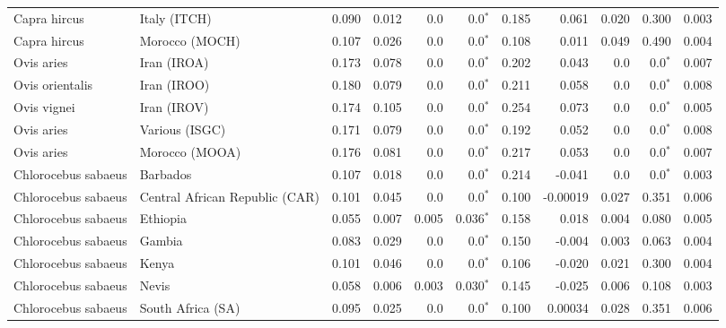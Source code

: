 \documentclass{article}
\begin{document}
\begin{table*}[h!]
\begin{adjustbox}{width = 1\textwidth}
\begin{tabular}{|l|l|r|r|r|r|r|r|r|r|r|}
\rowcolor{LIGHTGREY} Capra hircus & Italy (ITCH) & 0.090 & 0.012 & 0.0 & 0.0$\bm{^*}$ & 0.185 & 0.061 & 0.020 & 0.300\hspace{5pt} & 0.003 \\
\rowcolor{LIGHTGREY} Capra hircus & Morocco (MOCH) & 0.107 & 0.026 & 0.0 & 0.0$\bm{^*}$ & 0.108 & 0.011 & 0.049 & 0.490\hspace{5pt} & 0.004 \\ \hline
					 Ovis aries & Iran (IROA) & 0.173 & 0.078 & 0.0 & 0.0$\bm{^*}$ & 0.202 & 0.043 & 0.0 & 0.0$\bm{^*}$ & 0.007 \\
					 Ovis orientalis & Iran (IROO) & 0.180 & 0.079 & 0.0 & 0.0$\bm{^*}$ & 0.211 & 0.058 & 0.0 & 0.0$\bm{^*}$ & 0.008 \\
					 Ovis vignei & Iran (IROV) & 0.174 & 0.105 & 0.0 & 0.0$\bm{^*}$ & 0.254 & 0.073 & 0.0 & 0.0$\bm{^*}$ & 0.005 \\
					 Ovis aries & Various (ISGC) & 0.171 & 0.079 & 0.0 & 0.0$\bm{^*}$ & 0.192 & 0.052 & 0.0 & 0.0$\bm{^*}$ & 0.008 \\
					 Ovis aries & Morocco (MOOA) & 0.176 & 0.081 & 0.0 & 0.0$\bm{^*}$ & 0.217 & 0.053 & 0.0 & 0.0$\bm{^*}$ & 0.007 \\ \hline
\rowcolor{LIGHTGREY} Chlorocebus sabaeus & Barbados & 0.107 & 0.018 & 0.0 & 0.0$\bm{^*}$ & 0.214 & -0.041 & 0.0 & 0.0$\bm{^*}$ & 0.003 \\
\rowcolor{LIGHTGREY} Chlorocebus sabaeus & Central African Republic (CAR) & 0.101 & 0.045 & 0.0 & 0.0$\bm{^*}$ & 0.100 & -0.00019 & 0.027 & 0.351\hspace{5pt} & 0.006 \\
\rowcolor{LIGHTGREY} Chlorocebus sabaeus & Ethiopia & 0.055 & 0.007 & 0.005 & 0.036$\bm{^*}$ & 0.158 & 0.018 & 0.004 & 0.080\hspace{5pt} & 0.005 \\
\rowcolor{LIGHTGREY} Chlorocebus sabaeus & Gambia & 0.083 & 0.029 & 0.0 & 0.0$\bm{^*}$ & 0.150 & -0.004 & 0.003 & 0.063\hspace{5pt} & 0.004 \\
\rowcolor{LIGHTGREY} Chlorocebus sabaeus & Kenya & 0.101 & 0.046 & 0.0 & 0.0$\bm{^*}$ & 0.106 & -0.020 & 0.021 & 0.300\hspace{5pt} & 0.004 \\
\rowcolor{LIGHTGREY} Chlorocebus sabaeus & Nevis & 0.058 & 0.006 & 0.003 & 0.030$\bm{^*}$ & 0.145 & -0.025 & 0.006 & 0.108\hspace{5pt} & 0.003 \\
\rowcolor{LIGHTGREY} Chlorocebus sabaeus & South Africa (SA) & 0.095 & 0.025 & 0.0 & 0.0$\bm{^*}$ & 0.100 & 0.00034 & 0.028 & 0.351\hspace{5pt} & 0.006 \\

\end{tabular}
\end{adjustbox}
\end{table*}
\end{document}
